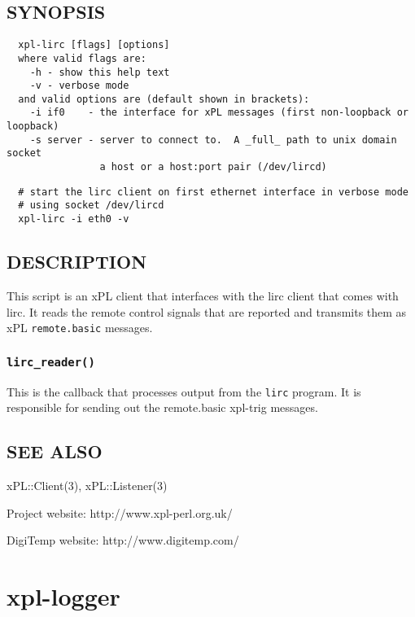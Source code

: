\documentclass[12pt,a4paper]{article}
\begin{document}
\subsection*{SYNOPSIS\label{xpl-lirc_SYNOPSIS}}
\begin{verbatim}
  xpl-lirc [flags] [options]
  where valid flags are:
    -h - show this help text
    -v - verbose mode
  and valid options are (default shown in brackets):
    -i if0    - the interface for xPL messages (first non-loopback or loopback)
    -s server - server to connect to.  A _full_ path to unix domain socket
                a host or a host:port pair (/dev/lircd)
\end{verbatim}
\begin{verbatim}
  # start the lirc client on first ethernet interface in verbose mode
  # using socket /dev/lircd
  xpl-lirc -i eth0 -v
\end{verbatim}
\subsection*{DESCRIPTION\label{xpl-lirc_DESCRIPTION}}


This script is an xPL client that interfaces with the lirc client that
comes with lirc.  It reads the remote control signals that are reported
and transmits them as xPL \texttt{remote.basic} messages.

\subsubsection*{\texttt{lirc\_reader()}\label{xpl-lirc_lirc_reader_}}


This is the callback that processes output from the \texttt{lirc} program.
It is responsible for sending out the remote.basic xpl-trig messages.

\subsection*{SEE ALSO\label{xpl-lirc_SEE_ALSO}}


xPL::Client(3), xPL::Listener(3)



Project website: http://www.xpl-perl.org.uk/



DigiTemp website: http://www.digitemp.com/

\newpage
\section{xpl-logger\label{xpl-logger}}
\end{document}
